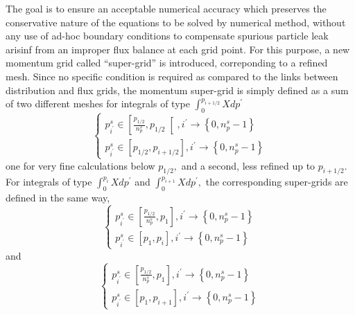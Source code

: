 The goal is to ensure an acceptable numerical accuracy which preserves the
conservative nature of the equations to be solved by numerical method,
without any use of ad-hoc boundary conditions to compensate spurious
particle leak arisinf from an improper flux balance at each grid point. For
this purpose, a new momentum grid called ``super-grid'' is introduced,
correponding to a refined mesh. Since no specific condition is required as
compared to the links between distribution and flux grids, the momentum
super-grid is simply defined as a sum of two different meshes for integrals
of type $\int_{0}^{p_{i+1/2}}Xdp^{\prime }$%
\begin{equation}
\left\{
\begin{array}{l}
p_{i^{\prime }}^{s}\in \left[ \frac{p_{1/2}}{n_{p}^{s}},p_{1/2}\right[
,i^{\prime }\rightarrow \left\{ 0,n_{p}^{s}-1\right\} \\
p_{i^{\prime }}^{s}\in \left[ p_{1/2},p_{i+1/2}\right] ,i^{\prime
}\rightarrow \left\{ 0,n_{p}^{s}-1\right\}
\end{array}
\right.
\end{equation}
one for very fine calculations below $p_{1/2},$ and a second, less refined
up to $p_{i+1/2}.$ For integrals of type $\int_{0}^{p_{i}}Xdp^{\prime }$ and
$\int_{0}^{p_{i+1}}Xdp^{\prime },$ the corresponding super-grids are defined
in the same way,
\begin{equation}
\left\{
\begin{array}{l}
p_{i^{\prime }}^{s}\in \left[ \frac{p_{1/2}}{n_{p}^{s}},p_{1}\right]
,i^{\prime }\rightarrow \left\{ 0,n_{p}^{s}-1\right\} \\
p_{i^{\prime }}^{s}\in \left[ p_{1},p_{i}\right] ,i^{\prime }\rightarrow
\left\{ 0,n_{p}^{s}-1\right\}
\end{array}
\right.
\end{equation}
and
\begin{equation}
\left\{
\begin{array}{l}
p_{i^{\prime }}^{s}\in \left[ \frac{p_{1/2}}{n_{p}^{s}},p_{1}\right]
,i^{\prime }\rightarrow \left\{ 0,n_{p}^{s}-1\right\} \\
p_{i^{\prime }}^{s}\in \left[ p_{1},p_{i+1}\right] ,i^{\prime }\rightarrow
\left\{ 0,n_{p}^{s}-1\right\}
\end{array}
\right.
\end{equation}

